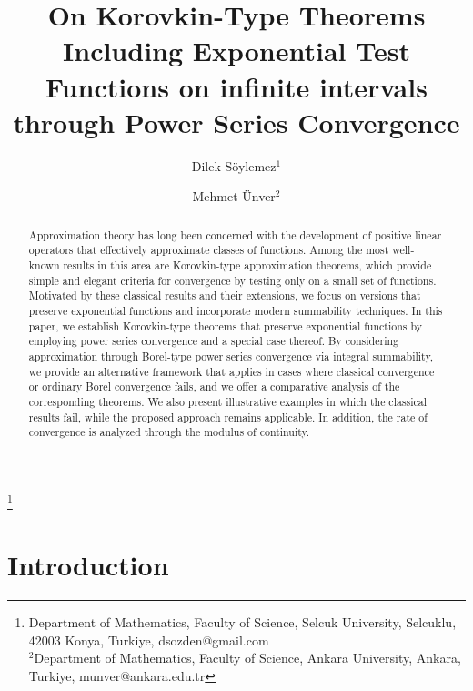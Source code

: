 \documentclass{amsart}
\theoremstyle{plain}
\numberwithin{equation}{section}
\begin{document}
\title[Korovkin type theorem via Power Series Methods]{On Korovkin-Type Theorems Including Exponential Test Functions on infinite intervals through Power Series Convergence}
\author{Dilek Söylemez$^1$}
\author{Mehmet Ünver$^2$}

\footnote{Department of Mathematics, Faculty of Science, Selcuk University,
Selcuklu, 42003 Konya, Turkiye, dsozden@gmail.com\\ $^{2}$Department of Mathematics, Faculty of Science, Ankara University,
Ankara, Turkiye, munver@ankara.edu.tr}


\begin{abstract}
Approximation theory has long been concerned with the development of positive linear operators that effectively approximate classes of functions. Among the most well-known results in this area are Korovkin-type approximation theorems, which provide simple and elegant criteria for convergence by testing only on a small set of functions. Motivated by these classical results and their extensions, we focus on versions that preserve exponential functions and incorporate modern summability techniques. In this paper, we establish Korovkin-type theorems that preserve exponential functions by employing power series convergence and a special case thereof. By considering approximation through Borel-type power series convergence via integral summability, we provide an alternative framework that applies in cases where classical convergence or ordinary Borel convergence fails, and we offer a comparative analysis of the corresponding theorems. We also present illustrative examples in which the classical results fail, while the proposed approach remains applicable. In addition, the rate of convergence is analyzed through the modulus of continuity.
\end{abstract}
\maketitle

\section{Introduction}
\end{document}
